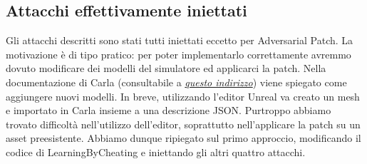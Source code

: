 \subsection{Attacchi effettivamente iniettati}
Gli attacchi  descritti sono stati tutti iniettati eccetto per Adversarial Patch. La motivazione è di tipo pratico: per poter implementarlo correttamente
avremmo dovuto modificare dei modelli del simulatore ed applicarci la patch. Nella documentazione di Carla (consultabile a \href{https://carla.readthedocs.io/en/latest/}{\emph{questo indirizzo}})
viene spiegato come aggiungere nuovi modelli. In breve, utilizzando l'editor Unreal va creato un mesh e importato in Carla insieme 
a una descrizione JSON. Purtroppo abbiamo trovato difficoltà nell'utilizzo dell'editor, soprattutto nell'applicare la patch su un asset preesistente. Abbiamo dunque
ripiegato sul primo approccio, modificando il codice di LearningByCheating e iniettando gli altri quattro attacchi.

